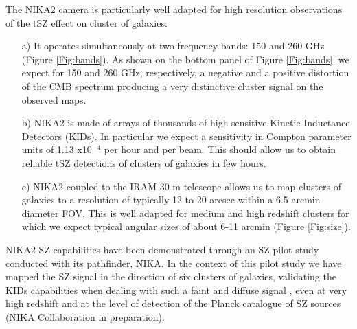 \documentclass[11pt,a4paper,twoside,graphicx,color]{article}
\begin{document}
The NIKA2 camera is particularly well adapted for high resolution observations of the tSZ effect on cluster of galaxies:
\begin{itemize}
\item [a)] It operates simultaneously at two frequency bands: 150 and 260 GHz (Figure \ref{Fig:bands}). As shown on the bottom panel of Figure \ref{Fig:bands}, we expect for 150 and 260 GHz, respectively, a negative and a positive distortion of the CMB spectrum producing a very distinctive cluster signal on the observed maps. 
\item [b)] NIKA2 is made of arrays of thousands of high sensitive Kinetic Inductance Detectors (KIDs). In particular we expect a sensitivity in Compton parameter units of 1.13 x10$^{-4}$ per hour and per beam. This should allow us to obtain reliable tSZ detections of clusters of galaxies in few hours.
\item [c)] NIKA2 coupled to the IRAM 30 m telescope allows us to map clusters of galaxies to a resolution of typically 12 to 20 arcsec within a 6.5 arcmin diameter FOV. This is well adapted for medium and high redshift clusters for which we expect typical angular sizes of about 6-11 arcmin (Figure \ref{Fig:size}).
\end{itemize}

NIKA2 SZ capabilities have been demonstrated through an SZ pilot study conducted with its pathfinder, NIKA. In the context of this pilot study we have mapped the SZ signal in the direction of six clusters of galaxies, validating the KIDs capabilities when dealing with such a faint and diffuse signal \citep[][dedicated to an intermediate redshift cluster, RX J1347.5-1145]{Adam2014}, even at very high redshift \citep[CL J1226.9+3332, at z~$=$~0.89,][]{Adam2015} and at the level of detection of the Planck catalogue of SZ sources (NIKA Collaboration in preparation).
\end{document}
